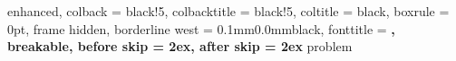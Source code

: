 \usepackage{titlesec}
\usepackage[many]{tcolorbox}

\titlespacing*{\chapter}{0cm}{-2.0cm}{0.50cm}
\titlespacing*{\section}{0cm}{0.50cm}{0.25cm}

\setlength{\parindent}{0pt}
\setlength{\parskip}{0.6ex}


%
    {enhanced,
    colback = black!5, %
    colbacktitle = black!5,
    coltitle = black,
    boxrule = 0pt,
    frame hidden,
    borderline west = {0.1mm}{0.0mm}{black},
    fonttitle = \bfseries\sffamily,
    breakable,
    before skip = 2ex,
    after skip = 2ex
}{problem}


